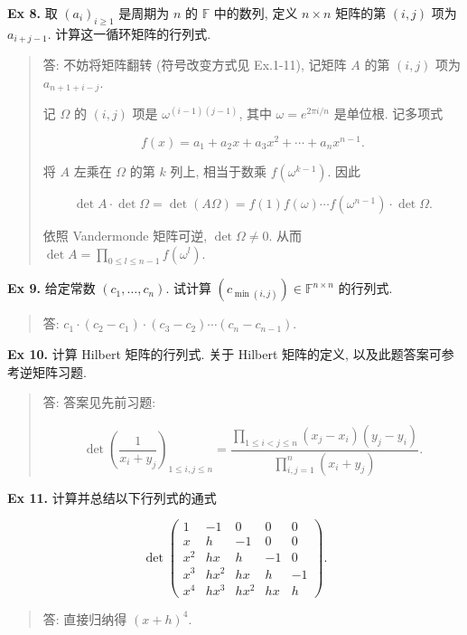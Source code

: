 \documentclass[
]{ctexart}
\begin{document}
\textbf{Ex 8.} 取 \((a_i)_{i\geq 1}\) 是周期为 \(n\) 的 \(\mathbb F\)
中的数列, 定义 \(n\times n\) 矩阵的第 \((i,j)\) 项为 \(a_{i+j-1}\).
计算这一循环矩阵的行列式.

\begin{quote}
答: 不妨将矩阵翻转 (符号改变方式见 Ex.1-11), 记矩阵 \(A\) 的第 \((i,j)\)
项为 \(a_{n+1+i-j}\).

记 \(\Omega\) 的 \((i,j)\) 项是 \(\omega^{(i-1)(j-1)}\), 其中
\(\omega=e^{2\pi i /n}\) 是单位根. 记多项式

\[f(x)=a_1+a_2x+a_3x^2+\cdots+a_nx^{n-1}.\]

将 \(A\) 左乘在 \(\Omega\) 的第 \(k\) 列上, 相当于数乘
\(f(\omega^{k-1})\). 因此

\[\det A\cdot \det \Omega =\det (A\Omega)=f(1)f(\omega)\cdots f(\omega^{n-1})\cdot \det \Omega.\]

依照 Vandermonde 矩阵可逆, \(\det\Omega\neq 0\). 从而
\(\det A= \prod _{0\leq l\leq n-1}f(\omega^l)\).
\end{quote}

\textbf{Ex 9.} 给定常数 \((c_1,\ldots, c_n)\). 试计算
\((c_{\min (i,j)})\in \mathbb F^{n\times n}\) 的行列式.

\begin{quote}
答: \(c_1\cdot (c_2-c_1)\cdot (c_3-c_2)\cdots (c_n-c_{n-1})\).
\end{quote}

\textbf{Ex 10.} 计算 Hilbert 矩阵的行列式. 关于 Hilbert 矩阵的定义,
以及此题答案可参考逆矩阵习题.

\begin{quote}
答: 答案见先前习题:

\[\det \left(\frac{1}{x _i+y _j}\right) _{1\le i,j \le n}=\frac{\prod _{1\le i < j\le n} (x _j-x _i)(y _j-y _i)}{\prod _{i,j=1}^n (x _i+y _j)}.\]
\end{quote}

\textbf{Ex 11.} 计算并总结以下行列式的通式

\[\det \begin{pmatrix}
1 & -1 & 0 & 0 & 0\\
x & h & -1 & 0 & 0\\
x^{2} & hx & h & -1 & 0\\
x^{3} & hx^{2} & hx & h & -1\\
x^{4} & hx^{3} & hx^{2} & hx & h
\end{pmatrix}.\]

\begin{quote}
答: 直接归纳得 \((x+h)^4\).
\end{quote}
\end{document}
